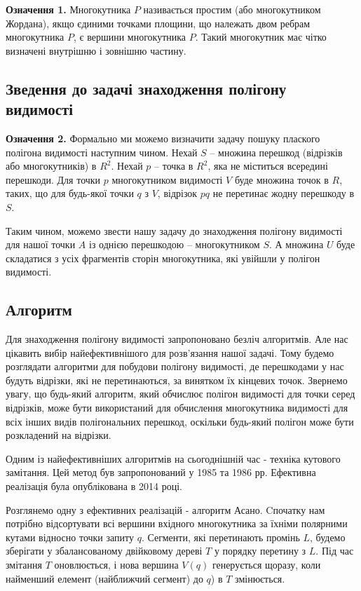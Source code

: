 \documentclass[a4paper, 12pt]{article}
\begin{document}
\textbf{Означення 1.} Многокутника $P$ називається простим (або многокутником Жордана), якщо єдиними точками площини, що належать двом ребрам многокутника $P$, є вершини многокутника $P$. Такий многокутник має чітко визначені внутрішню і зовнішню частину.\cite{SimplePolygon}

\subsection{Зведення до задачі знаходження полігону видимості}

\textbf{Означення 2.} Формально ми можемо визначити задачу пошуку плаского полігона видимості наступним чином. Нехай $S$ -- множина перешкод (відрізків або многокутників) в $R^2$. Нехай $p$ -- точка в $R^2$, яка не міститься всередині перешкоди. Для точки $p$ многокутником видимості $V$ буде множина точок в $R$, таких, що для будь-якої точки $q$ з $V$, відрізок $pq$ не перетинає жодну перешкоду в $S$.\cite{VisibilityPolygon}

Таким чином, можемо звести нашу задачу до знаходження полігону видимості для нашої точки $A$ із однією перешкодою -- многокутником $S$. А множина $U$ буде складатися з усіх фрагментів сторін многокутника, які увійшли у полігон видимості.


\subsection{Алгоритм}

Для знаходження полігону видимості запропоновано безліч алгоритмів. Але нас цікавить вибір найефективнішого для розв'язання нашої задачі. Тому будемо розглядати алгоритми для побудови полігону видимості, де перешкодами у нас будуть відрізки, які не перетинаються, за винятком їх кінцевих точок.
Звернемо увагу, що будь-який алгоритм, який обчислює полігон видимості для точки серед відрізків, може бути використаний для обчислення многокутника видимості для всіх інших видів полігональних перешкод, оскільки будь-який полігон може бути розкладений на відрізки.

Одним із найефективніших алгоритмів на сьогоднішній час - техніка кутового замітання. Цей метод був запропонований у 1985\cite{AsanoTetsuo} та 1986\cite{SuriSubhash} рр.  Ефективна реалізація була опублікована в 2014 році.\cite{BungiuFrancisc}

Розглянемо одну з ефективних реалізацій - алгоритм Асано. Cпочатку нам потрібно відсортувати всі вершини вхідного многокутника за їхніми полярними кутами відносно точки запиту $q$. Сегменти, які перетинають промінь $L$, будемо зберігати у збалансованому двійковому дереві $T$ у порядку перетину з $L$. Під час змітання $T$ оновлюється, і нова вершина $V(q)$ генерується щоразу, коли найменший елемент (найближчий сегмент) до $q$) в $T$ змінюється.\cite{BungiuFrancisc}
\end{document}
